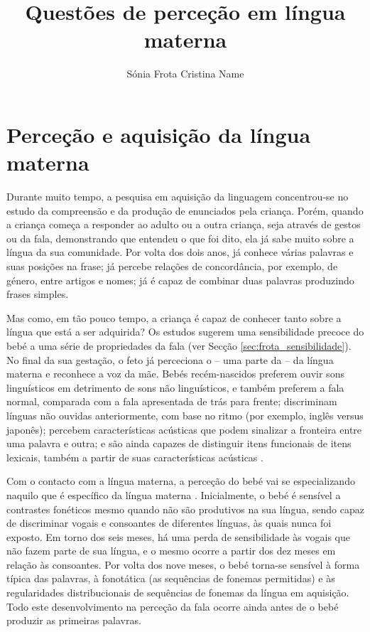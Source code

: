 \documentclass[output=paper]{LSP/langsci}
\author{Sónia Frota\affiliation{Universidade de Lisboa, Faculdade de Letras, Centro de Linguística}\lastand 
Cristina Name\affiliation{Universidade Federal de Juiz de Fora, CNPq}
}
\title{Questões de perceção em língua materna}
\begin{document}
\section{Perceção e aquisição da língua materna}
\label{sec:frota_percecao}

Durante muito tempo, a pesquisa em aquisição da linguagem concentrou-se no estudo da compreensão e da produção de enunciados pela criança. Porém, quando a criança começa a responder ao adulto ou a outra criança, seja através de gestos ou da fala, demonstrando que entendeu o que foi dito, ela já sabe muito sobre a língua da sua comunidade. Por volta dos dois anos, já conhece várias palavras e suas posições na frase; já percebe relações de concordância, por exemplo, de género, entre artigos e nomes; já é capaz de combinar duas palavras produzindo frases simples. 

Mas como, em tão pouco tempo, a criança é capaz de conhecer tanto sobre a língua que está a ser adquirida? Os estudos sugerem uma sensibilidade precoce do bebé a uma série de propriedades da fala (ver Secção \ref{sec:frota_sensibilidade}). No final da sua gestação, o feto já perceciona o  -- uma parte da  --  da língua materna e reconhece a voz da mãe. Bebés recém-nascidos preferem ouvir sons linguísticos em detrimento de sons não linguísticos, e também preferem a fala normal, comparada com a fala apresentada de trás para frente; discriminam línguas não ouvidas anteriormente, com base no ritmo (por exemplo, inglês versus japonês); percebem características acústicas que podem sinalizar a fronteira entre uma palavra e outra; e são ainda capazes de distinguir itens funcionais de itens lexicais, também a partir de suas características acústicas \citep{gervainmehler2010}.

Com o contacto com a língua materna, a perceção do bebé vai se especializando naquilo que é específico da língua materna \citep{kuhl2004}. Inicialmente, o bebé é sensível a contrastes fonéticos mesmo quando não são produtivos na sua língua, sendo capaz de discriminar vogais e consoantes de diferentes línguas, às quais nunca foi exposto. Em torno dos seis meses, há uma perda de sensibilidade às vogais que não fazem parte de sua língua, e o mesmo ocorre a partir dos dez meses em relação às consoantes. Por volta dos nove meses, o bebé torna-se sensível à forma típica das palavras, à fonotática (as sequências de fonemas permitidas) e às regularidades distribucionais de sequências de fonemas da língua em aquisição. Todo este desenvolvimento na perceção da fala ocorre ainda antes de o bebé produzir as primeiras palavras.
\end{document}
